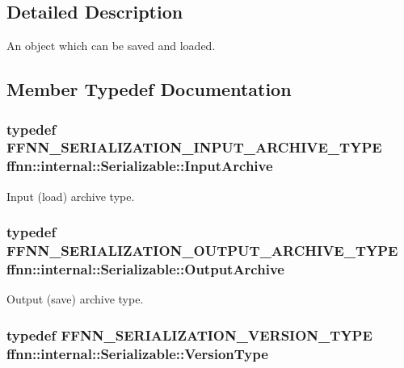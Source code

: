 \subsection{Detailed Description}
An object which can be saved and loaded. 

\subsection{Member Typedef Documentation}
\hypertarget{classffnn_1_1internal_1_1_serializable_aadc27d79d606f35a82dd88bad33fa6d2}{
\subsubsection[{Input\-Archive}]{\setlength{\rightskip}{0pt plus 5cm}typedef {\bf F\-F\-N\-N\-\_\-\-S\-E\-R\-I\-A\-L\-I\-Z\-A\-T\-I\-O\-N\-\_\-\-I\-N\-P\-U\-T\-\_\-\-A\-R\-C\-H\-I\-V\-E\-\_\-\-T\-Y\-P\-E} {\bf ffnn\-::internal\-::\-Serializable\-::\-Input\-Archive}}}\label{classffnn_1_1internal_1_1_serializable_aadc27d79d606f35a82dd88bad33fa6d2}


Input (load) archive type. 

\hypertarget{classffnn_1_1internal_1_1_serializable_acf5baead716eb277337a4437e88a5743}{
\subsubsection[{Output\-Archive}]{\setlength{\rightskip}{0pt plus 5cm}typedef {\bf F\-F\-N\-N\-\_\-\-S\-E\-R\-I\-A\-L\-I\-Z\-A\-T\-I\-O\-N\-\_\-\-O\-U\-T\-P\-U\-T\-\_\-\-A\-R\-C\-H\-I\-V\-E\-\_\-\-T\-Y\-P\-E} {\bf ffnn\-::internal\-::\-Serializable\-::\-Output\-Archive}}}\label{classffnn_1_1internal_1_1_serializable_acf5baead716eb277337a4437e88a5743}


Output (save) archive type. 

\hypertarget{classffnn_1_1internal_1_1_serializable_a32fe7d82b0caf9fe8b6fb7c312a26028}{
\subsubsection[{Version\-Type}]{\setlength{\rightskip}{0pt plus 5cm}typedef {\bf F\-F\-N\-N\-\_\-\-S\-E\-R\-I\-A\-L\-I\-Z\-A\-T\-I\-O\-N\-\_\-\-V\-E\-R\-S\-I\-O\-N\-\_\-\-T\-Y\-P\-E} {\bf ffnn\-::internal\-::\-Serializable\-::\-Version\-Type}}}\label{classffnn_1_1internal_1_1_serializable_a32fe7d82b0caf9fe8b6fb7c312a26028}


